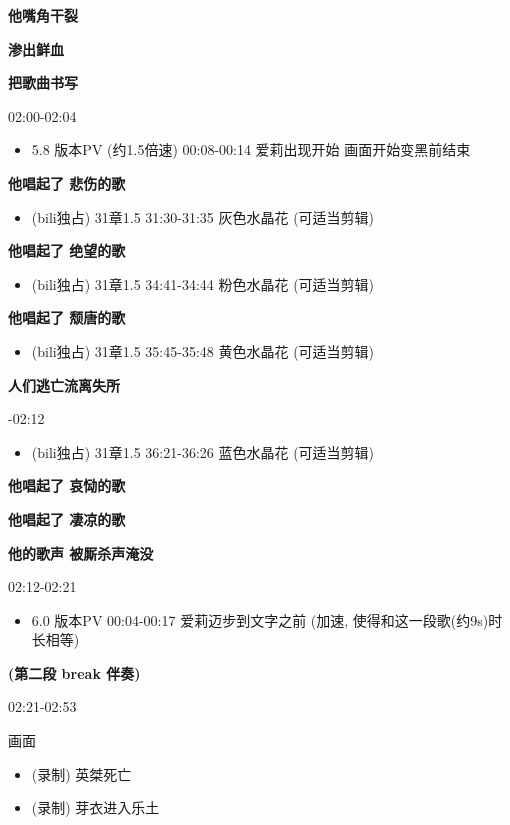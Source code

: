 \documentclass[a4paper]{article}
\begin{document}
\textbf{他嘴角干裂}

\textbf{渗出鲜血}

\textbf{把歌曲书写}

02:00-02:04

\begin{itemize}
    \item 5.8 版本PV (约1.5倍速) 00:08-00:14 爱莉出现开始 画面开始变黑前结束
\end{itemize}

\textbf{他唱起了 悲伤的歌}

\begin{itemize}
    \item (bili独占) 31章1.5 31:30-31:35 灰色水晶花 (可适当剪辑)
\end{itemize}

\textbf{他唱起了 绝望的歌}

\begin{itemize}
    \item (bili独占) 31章1.5 34:41-34:44 粉色水晶花 (可适当剪辑)
\end{itemize}

\textbf{他唱起了 颓唐的歌}

\begin{itemize}
    \item (bili独占) 31章1.5 35:45-35:48 黄色水晶花 (可适当剪辑)
\end{itemize}

\textbf{人们逃亡流离失所}

-02:12

\begin{itemize}
    \item (bili独占) 31章1.5 36:21-36:26 蓝色水晶花 (可适当剪辑)
\end{itemize}

\textbf{他唱起了 哀恸的歌}

\textbf{他唱起了 凄凉的歌}

\textbf{他的歌声 被厮杀声淹没}

02:12-02:21

\begin{itemize}
    \item 6.0 版本PV 00:04-00:17 爱莉迈步到文字之前 (加速, 使得和这一段歌(约9s)时长相等)
\end{itemize}

\textbf{(第二段 break 伴奏)}

02:21-02:53

画面

\begin{itemize}
    \item (录制) 英桀死亡
    \item (录制) 芽衣进入乐土
\end{itemize}
\end{document}
